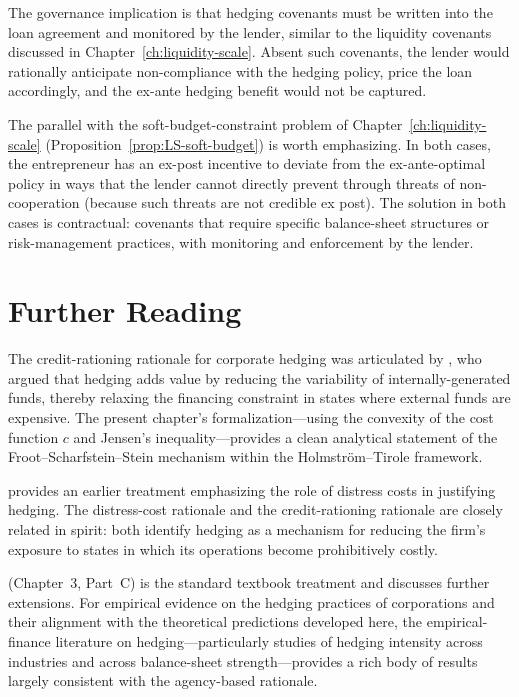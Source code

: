 \documentclass[11pt,a4paper,oneside]{book}
\theoremstyle{plain}
\theoremstyle{definition}
\theoremstyle{remark}
\numberwithin{equation}{chapter}
\begin{document}
The governance implication is that hedging covenants must be written into the loan agreement and monitored by the lender, similar to the liquidity covenants discussed in Chapter~\ref{ch:liquidity-scale}.
Absent such covenants, the lender would rationally anticipate non-compliance with the hedging policy, price the loan accordingly, and the ex-ante hedging benefit would not be captured.

The parallel with the soft-budget-constraint problem of Chapter~\ref{ch:liquidity-scale} (Proposition~\ref{prop:LS-soft-budget}) is worth emphasizing.
In both cases, the entrepreneur has an ex-post incentive to deviate from the ex-ante-optimal policy in ways that the lender cannot directly prevent through threats of non-cooperation (because such threats are not credible ex post).
The solution in both cases is contractual: covenants that require specific balance-sheet structures or risk-management practices, with monitoring and enforcement by the lender.

\section{Further Reading}
\label{sec:RM-further-reading}

The credit-rationing rationale for corporate hedging was articulated by \citet{FrootScharfsteinStein1993}, who argued that hedging adds value by reducing the variability of internally-generated funds, thereby relaxing the financing constraint in states where external funds are expensive.
The present chapter's formalization---using the convexity of the cost function $c$ and Jensen's inequality---provides a clean analytical statement of the Froot--Scharfstein--Stein mechanism within the Holmstr\"om--Tirole framework.

\citet{Stulz1984} provides an earlier treatment emphasizing the role of distress costs in justifying hedging.
The distress-cost rationale and the credit-rationing rationale are closely related in spirit: both identify hedging as a mechanism for reducing the firm's exposure to states in which its operations become prohibitively costly.

\citet{Tirole2006} (Chapter~3, Part~C) is the standard textbook treatment and discusses further extensions.
For empirical evidence on the hedging practices of corporations and their alignment with the theoretical predictions developed here, the empirical-finance literature on hedging---particularly studies of hedging intensity across industries and across balance-sheet strength---provides a rich body of results largely consistent with the agency-based rationale.
\end{document}

